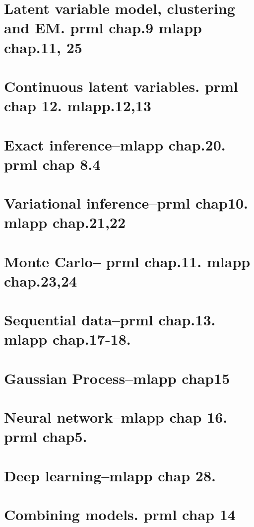 \documentclass{article}
\begin{document}
\section{Latent variable model, clustering and EM. prml chap.9 mlapp chap.11, 25}

\section{Continuous latent variables. prml chap 12. mlapp.12,13}

\section{Exact inference--mlapp chap.20. prml chap 8.4}

\section{Variational inference--prml chap10. mlapp chap.21,22}

\section{Monte Carlo-- prml chap.11. mlapp chap.23,24}

\section{Sequential data--prml chap.13. mlapp chap.17-18.}

\section{Gaussian Process--mlapp chap15}

\section{Neural network--mlapp chap 16. prml chap5.}

\section{Deep learning--mlapp chap 28.}

\section{Combining models. prml chap 14}
\end{document}
